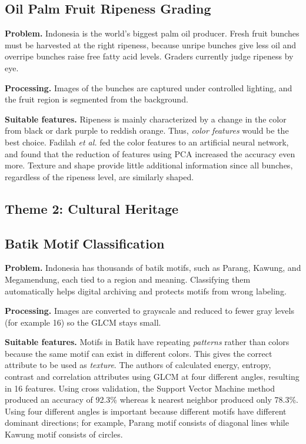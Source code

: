 \documentclass[conference]{IEEEtran}
\begin{document}
\subsection{Oil Palm Fruit Ripeness Grading}
\textbf{Problem.} Indonesia is the world's biggest palm oil producer. Fresh fruit bunches must be harvested at the right ripeness, because unripe bunches give less oil and overripe bunches raise free fatty acid levels. Graders currently judge ripeness by eye.

\textbf{Processing.} Images of the bunches are captured under controlled lighting, and the fruit region is segmented from the background.

\textbf{Suitable features.} Ripeness is mainly characterized by a change in the color from black or dark purple to reddish orange. Thus, \emph{color features} would be the best choice. Fadilah \emph{et al.} \cite{fadilah} fed the color features to an artificial neural network, and found that the reduction of features using PCA increased the accuracy even more. Texture and shape provide little additional information since all bunches, regardless of the ripeness level, are similarly shaped.

\subsection*{Theme 2: Cultural Heritage}

\subsection{Batik Motif Classification}
\textbf{Problem.} Indonesia has thousands of batik motifs, such as Parang, Kawung, and Megamendung, each tied to a region and meaning. Classifying them automatically helps digital archiving and protects motifs from wrong labeling.

\textbf{Processing.} Images are converted to grayscale and reduced to fewer gray levels (for example 16) so the GLCM stays small.

\textbf{Suitable features.} Motifs in Batik have repeating \emph{patterns} rather than colors because the same motif can exist in different colors. This gives the correct attribute to be used as \emph{texture}. The authors of \cite{minarno} calculated energy, entropy, contrast and correlation attributes using GLCM at four different angles, resulting in 16 features. Using cross validation, the Support Vector Machine method produced an accuracy of 92.3\% whereas k nearest neighbor produced only 78.3\%. Using four different angles is important because different motifs have different dominant directions; for example, Parang motif consists of diagonal lines while Kawung motif consists of circles.
\end{document}
